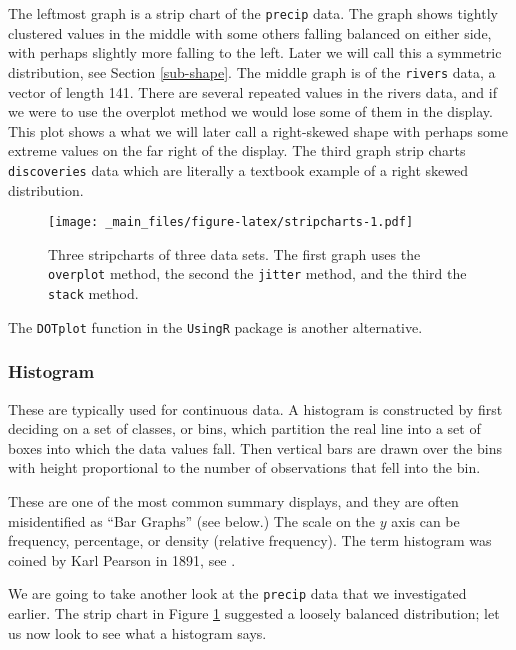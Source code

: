 \documentclass[]{book}
\numberwithin{equation}{chapter}
\numberwithin{figure}{chapter}
\theoremstyle{plain}
\theoremstyle{definition}
\theoremstyle{remark}
\theoremstyle{definition}
\theoremstyle{definition}
\theoremstyle{remark}
\let\BeginKnitrBlock\begin \let\EndKnitrBlock\end
\begin{document}
The leftmost graph is a strip chart of the \texttt{precip} data. The
graph shows tightly clustered values in the middle with some others
falling balanced on either side, with perhaps slightly more falling to
the left. Later we will call this a symmetric distribution, see Section
\ref{sub-shape}. The middle graph is of the \texttt{rivers} data, a
vector of length 141. There are several repeated values in the rivers
data, and if we were to use the overplot method we would lose some of
them in the display. This plot shows a what we will later call a
right-skewed shape with perhaps some extreme values on the far right of
the display. The third graph strip charts \texttt{discoveries} data
which are literally a textbook example of a right skewed distribution.

\begin{figure}[htbp]
\centering
\texttt{[image: \_main\_files/figure-latex/stripcharts-1.pdf]}
\caption{\label{fig:stripcharts}\small Three stripcharts of three data sets. The
first graph uses the \texttt{overplot} method, the second the
\texttt{jitter} method, and the third the \texttt{stack} method.}
\end{figure}





The \texttt{DOTplot}  function in the
\texttt{UsingR}  package
\autocite{UsingR} is another alternative.

\subsubsection{\texorpdfstring{Histogram
}{Histogram }}\label{histogram}

These are typically used for continuous data. A histogram is constructed
by first deciding on a set of classes, or bins, which partition the real
line into a set of boxes into which the data values fall. Then vertical
bars are drawn over the bins with height proportional to the number of
observations that fell into the bin.

These are one of the most common summary displays, and they are often
misidentified as ``Bar Graphs'' (see below.) The scale on the \(y\) axis
can be frequency, percentage, or density (relative frequency). The term
histogram was coined by Karl Pearson in 1891, see \autocite{Miller}.

\bigskip

\BeginKnitrBlock{example}[Annual Precipitation in US Cities]
\protect\hypertarget{ex:annual}{}{\label{ex:annual} \iffalse (Annual
Precipitation in US Cities) \fi }We are going to take another look at
the \texttt{precip}  data that
we investigated earlier. The strip chart in Figure \ref{fig:stripcharts}
suggested a loosely balanced distribution; let us now look to see what a
histogram says.
\EndKnitrBlock{example}
\end{document}
